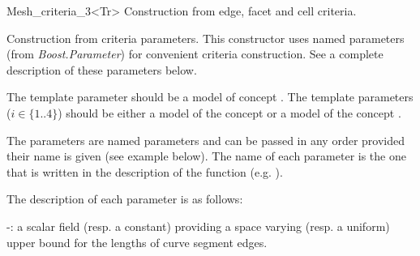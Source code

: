 \begin{ccRefClass}{Mesh_criteria_3<Tr>}
{Construction from edge, facet and cell criteria.}

{Construction from  criteria  parameters. This constructor uses named
  parameters (from \emph{Boost.Parameter}) for convenient criteria
  construction. See a complete description of these parameters below.}

The template parameter  should be a model of concept . 
The template parameters   ($i\in\{1..4\}$) should be either a model
of the concept  or a model of the concept .

The parameters are named parameters 
and can be passed in any order provided their name is given (see example below).
The name of each parameter is the one that is written in the description of
the function (e.g. ).



The description of each parameter is as follows:

-: a scalar field (resp. a constant) providing a space varying 
  (resp. a uniform)
  upper bound for the lengths of curve segment edges.


\end{ccRefClass}
